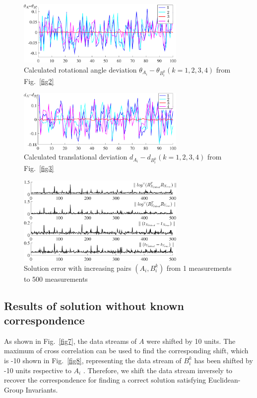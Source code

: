 \documentclass[conference,letterpaper]{IEEEtran}
\begin{document}
\begin{center}
\begin{figure}[htbp]
\centering
\includegraphics[width=3.2in]{fig4.eps}
\caption{
Calculated rotational angle deviation $\theta_{A_{i}} - \theta_{B_{i}^{k}} (k=1,2,3,4)$ from Fig.~\ref{fig2}
}
\label{fig4}
\end{figure}
\end{center}

\begin{center}
\begin{figure}[htbp]
\centering
\includegraphics[width=3.2in]{fig5.eps}
\caption{
Calculated translational deviation $d_{A_{i}} - d_{B_{i}^{k}} (k=1,2,3,4)$ from Fig.~\ref{fig3}
}
\label{fig5}
\end{figure}
\end{center}

\begin{center}
\begin{figure}[htbp]
\centering
\includegraphics[width=3.2in]{fig6.eps}
\caption{
Solution error with increasing pairs $(A_{i},B_{i}^{k})$ from 1 measurements to 500 measurements
}
\label{fig6}
\end{figure}
\end{center}

\subsection{Results of solution without known correspondence}
As shown in Fig.~\ref{fig7}, the data streams of $A$ were shifted by 10 units. The maximum of cross correlation can be used to find the corresponding shift, which is -10 shown in Fig.~\ref{fig8}, representing the data stream of $B_{i}^{k}$ has been shifted by -10 units respective to ${A_{i}}$ . Therefore, we shift the data stream inversely to recover the correspondence for finding a correct solution satisfying Euclidean-Group Invariants.
\end{document}
